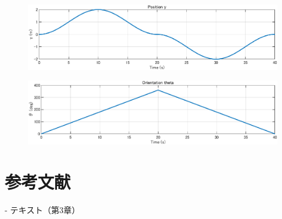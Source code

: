 \documentclass[10pt,a4paper,titlepage]{jreport} %
\begin{document}
\begin{figure}[H] %
  \centering
  \includegraphics[width=0.6\linewidth]{242C2016_NaoOkumura_3_4_c.eps} %
\end{figure}

\begin{figure}[H] %
  \centering
  \includegraphics[width=0.6\linewidth]{242C2016_NaoOkumura_3_4_d.eps} %
\end{figure}

\chapter{参考文献}

- テキスト（第3章）
\end{document}
